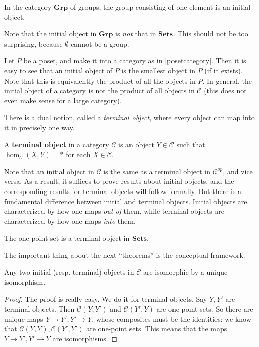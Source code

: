 \begin{example} 
In the category $\mathbf{Grp}$ of groups, the group consisting of one element
is an initial object.
\end{example} 

Note that the initial object in $\mathbf{Grp}$ is \emph{not} that in
$\mathbf{Sets}$. This should not be too surprising, because $\emptyset$ cannot
be a group.

\begin{example} 
Let $P$ be a poset, and make it into a category as in \cref{posetcategory}.
Then it is easy to see that an initial object of $P$ is the smallest object in
$P$ (if it exists). Note that this is equivalently the product of all the
objects in $P$. In general, the initial object of a category is not the product
of all objects in $\mathcal{C}$ (this does not even make sense for a large
category).
\end{example} 

There is a dual notion, called a \textit{terminal object}, where every object
can map into it in precisely one way.
\begin{definition}
A \textbf{terminal object} in a category $\mathcal{C}$ is an object $Y \in
\mathcal{C}$ such that $\hom_{\mathcal{C}}(X, Y) = \ast$ for each $X \in \mathcal{C}$.
\end{definition}

Note that an initial object in $\mathcal{C}$ is the same as a terminal object
in $\mathcal{C}^{op}$, and vice versa. As a result, it suffices to prove 
results about initial objects, and the corresponding results for terminal
objects will follow formally.
But there is a fundamental difference between initial and terminal objects.
Initial objects are characterized by how one maps \emph{out of} them, while
terminal objects are characterized by how one maps \emph{into} them. 
\begin{example}
The one point set is a terminal object in $\mathbf{Sets}$.
\end{example}



The important thing about the next ``theorems'' is the conceptual framework.
\begin{proposition}
Any two initial (resp. terminal) objects in $\mathcal{C}$ are isomorphic by a
unique isomorphism.
\end{proposition}
\begin{proof}
The proof is really easy. We do it for terminal objects. Say $Y, Y'$ are
terminal objects. Then $\mathcal{C}(Y, Y')$ and $\mathcal{C}(Y', Y)$ are one
point sets. So there are unique maps $Y \to Y', Y' \to Y$, whose composites
must be the identities: we know that $\mathcal{C}(Y, Y) , \mathcal{C}(Y', Y')$
are one-point sets. This means that the maps $Y \to Y', Y' \to Y$ are
isomorphisms.
\end{proof}

